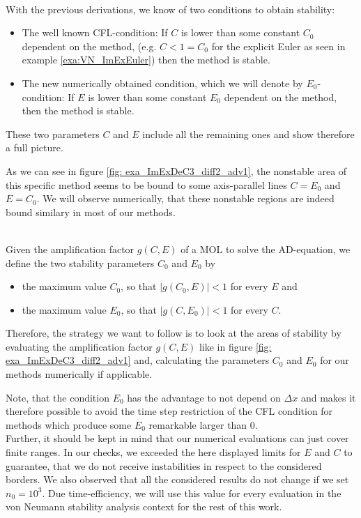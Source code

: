 \begin{remark}\mbox{}\\
	With the previous derivations, we know of two conditions to obtain stability:
	\begin{itemize}
		\item The well known CFL-condition: If $C$ is lower than some constant $C_0$ dependent on the method, (e.g. $C<1=C_0$ for the explicit Euler as seen in example \ref{exa:VN_ImExEuler}) then the method is stable.
		\item The new numerically obtained condition, which we will denote by $E_0$-condition: If $E$ is lower than some constant $E_0$ dependent on the method, then the method is stable.
	\end{itemize}
	
	These two parameters $C$ and $E$ include all the remaining ones and show therefore a full picture.
\end{remark}

As we can see in figure \ref{fig: exa_ImExDeC3_diff2_adv1}, the nonstable area of this specific method seems to be bound to some axis-parallel lines $C=E_0$ and $E=C_0$. We will observe numerically, that these nonstable regions are indeed bound similary in most of our methods.\\
\begin{definition}\mbox{}\\
	Given the amplification factor $g(C,E)$ of a MOL to solve the AD-equation, we define the two stability parameters $C_0$ and $E_0$ by
	\begin{itemize}
		\item the maximum value $C_0$, so that $\lvert g(C_0,E)\rvert<1$ for every $E$ and
		\item the maximum value $E_0$, so that $\lvert g(C,E_0)\rvert<1$ for every $C$.
	\end{itemize}
\end{definition}
Therefore, the strategy we want to follow is to look at the areas of stability by evaluating the amplification factor $g(C,E)$ like in figure \ref{fig: exa_ImExDeC3_diff2_adv1} and, calculating the parameters $C_0$ and $E_0$ for our methods numerically if applicable.

Note, that the condition $E_0$ has the advantage to not depend on $\Delta x$ and makes it therefore possible to avoid the time step restriction of the CFL condition for methods which produce some $E_0$ remarkable larger than 0. \\
Further, it should be kept in mind that our numerical evaluations can just cover finite ranges. In our checks, we exceeded the here displayed limits for $E$ and $C$ to guarantee, that we do not receive instabilities in respect to the considered borders.
We also observed that all the considered results do not change if we set $n_0=10^3$. Due time-efficiency, we will use this value for every evaluation in the von Neumann stability analysis context for the rest of this work.
